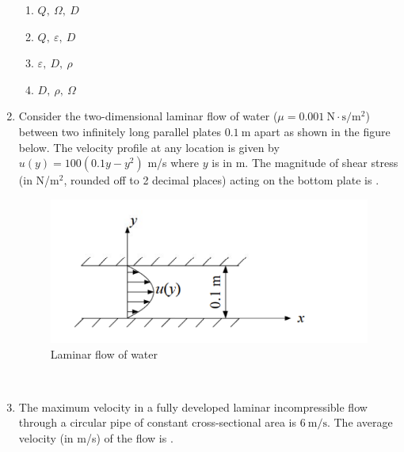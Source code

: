 \documentclass[journal,12pt,onecolumn]{IEEEtran}
\begin{document}
\begin{enumerate}[label=\arabic*)]
\vspace{0.2cm}
\begin{enumerate}[label=\alph*)]
\item $Q,\ \Omega,\ D$
\item $Q,\ \varepsilon,\ D$
\item $\varepsilon,\ D,\ \rho$
\item $D,\ \rho,\ \Omega$
\end{enumerate}

\vspace{0.5cm}

\item Consider the two-dimensional laminar flow of water ($\mu=0.001\ \mathrm{N\cdot s/m^2}$) between two infinitely long parallel plates $0.1\ \mathrm{m}$ apart as shown in the figure below. The velocity profile at any location is given by $u(y)=100(0.1y-y^2)$ m/s where $y$ is in m. The magnitude of shear stress (in N/m$^2$, rounded off to 2 decimal places) acting on the bottom plate is \underline{\hspace{2cm}}.

\begin{figure}[htbp]
  \centering
  \includegraphics[width=.7\linewidth]{figs/B/fig1.png}
  \caption{Laminar flow of water}
  \label{B/fig1}
\end{figure}

\hfill{} \\

\vspace{0.5cm}

\item The maximum velocity in a fully developed laminar incompressible flow through a circular pipe of constant cross-sectional area is $6\ \mathrm{m/s}$. The average velocity (in m/s) of the flow is \underline{\hspace{2cm}}.
\vspace{0.2cm}
\hfill{} \\

\vspace{0.5cm}


\end{enumerate}
\end{document}
